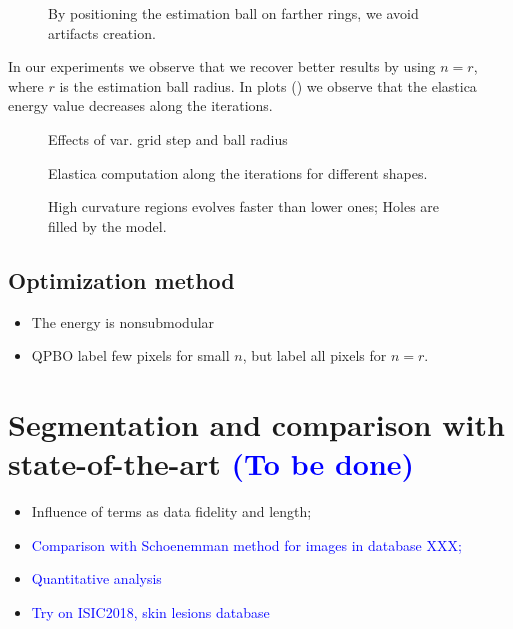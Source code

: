 \documentclass[runningheads]{llncs}
\newcommand{\todo}[1]{{\textcolor{blue}{#1}}}
\begin{document}
\begin{figure}[!ht]
\label{fig:mx-square-flow}
\caption{By positioning the estimation ball on farther rings, we avoid artifacts creation. }
\end{figure}

In our experiments we observe that we recover better results by using $n=r$, where $r$ is the estimation ball radius. In plots () we observe that the elastica energy value decreases along the iterations.


\begin{figure}[!ht]
\label{fig:mx-flow-gs-radius-effect}
\caption{Effects of var. grid step and ball radius}
\end{figure}

\begin{figure}[!ht]
\label{gif:mx-elastica-plots}
\caption{Elastica computation along the iterations for different shapes. }
\end{figure}



\begin{figure}[!ht]
\label{fig:mx-speed-variation-hole-filling}
\caption{High curvature regions evolves faster than lower ones; Holes are filled by the model. }
\end{figure}


\subsection{Optimization method}

\begin{itemize}
	\item{The energy is nonsubmodular}
	\item{QPBO label few pixels for small $n$, but label all pixels for $n=r$.}	
\end{itemize}


\section{Segmentation and comparison with state-of-the-art \todo{(To be done)}}

\begin{itemize}
    \item{Influence of terms as data fidelity and length; }
	\item{\todo{Comparison with Schoenemman method for images in database XXX; }}
	\item{\todo{Quantitative analysis}}
	\item{\todo{Try on ISIC2018, skin lesions database}}
\end{itemize}
\end{document}
